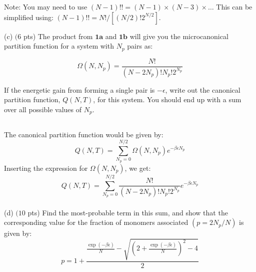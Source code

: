 \documentclass[10pt]{article}
\begin{document}
Note: You may need to use $(N-1) ! !=(N-1) \times(N-3) \times \ldots$ This can be simplified using: $(N-1) ! !=N ! /\left[(N / 2) ! 2^{N / 2}\right]$.

(c) $(6$ pts) The product from $\mathbf{1 a}$ and $\mathbf{1} \mathbf{b}$ will give you the microcanonical partition function for a system with $N_{p}$ pairs as:

$$
\Omega\left(N, N_{p}\right)=\frac{N !}{\left(N-2 N_{p}\right) ! N_{p} ! 2^{N_{p}}}
$$

If the energetic gain from forming a single pair is $-\epsilon$, write out the canonical partition function, $Q(N, T)$, for this system. You should end up with a sum over all possible values of $N_{p}$.
\subsection{}
The canonical partition function would be given by:
\begin{equation}
  Q(N, T) = \sum_{N_p=0}^{N/2} \Omega(N, N_p) e^{-\beta \epsilon N_p}
\end{equation}
Inserting the expression for $\Omega(N, N_p)$, we get:
\begin{equation}
  Q(N, T) = \sum_{N_p=0}^{N/2} \frac{N !}{\left(N-2 N_{p}\right) ! N_{p} ! 2^{N_{p}}} e^{-\beta \epsilon N_p}
\end{equation}
\\
(d) $(10$ pts) Find the most-probable term in this sum, and show that the corresponding value for the fraction of monomers associated $\left(p=2 N_{p} / N\right)$ is given by:
$$
p=1+\frac{\frac{\exp (-\beta \epsilon)}{N}-\sqrt{\left(2+\frac{\exp (-\beta \epsilon)}{N}\right)^{2}-4}}{2}
$$
\end{document}
